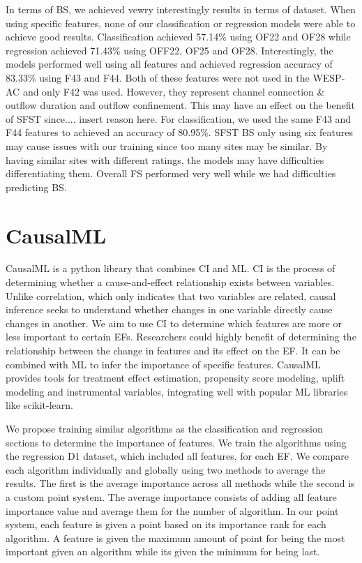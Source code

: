 \documentclass[12pt,letterpaper]{article}
\begin{document}
In terms of \ac{BS}, we achieved vewry interestingly results in terms of dataset.
When using specific features, none of our classification or regression models were able to achieve good results.
Classification achieved 57.14\% using OF22 and OF28 while regression achieved 71.43\% using OFF22, OF25 and OF28.
Interestingly, the models performed well using all features and achieved regression accuracy of 83.33\% using F43 and F44.
Both of these features were not used in the WESP-AC and only F42 was used.
However, they represent channel connection \& outflow duration and outflow confinement.
This may have an effect on the benefit of \ac{SFST} since.... insert reason here.
For classification, we used the same F43 and F44 features to achieved an accuracy of 80.95\%.
\ac{SFST} \ac{BS} only using six features may cause issues with our training since too many sites may be similar.
By having similar sites with different ratings, the models may have difficulties differentiating them.
Overall \ac{FS} performed very well while we had difficulties predicting \ac{BS}.




\section{CausalML}
CausalML is a python library that combines \ac{CI} and \ac{ML}.
\ac{CI} is the process of determining whether a cause-and-effect relationship exists between variables.
Unlike correlation, which only indicates that two variables are related, causal inference seeks to understand whether changes in one variable directly cause changes in another. 
We aim to use \ac{CI} to determine which features are more or less important to certain \ac{EF}s.
Researchers could highly benefit of determining the relationship between the change in features and its effect on the \ac{EF}.
It can be combined with \ac{ML} to infer the importance of specific features.
CausalML provides tools for treatment effect estimation, propensity score modeling, uplift modeling and instrumental variables, integrating well with popular \ac{ML} libraries like scikit-learn.

We propose training similar algorithms as the classification and regression sections to determine the importance of features.
We train the algorithms using the regression D1 dataset, which included all features, for each \ac{EF}.
We compare each algorithm individually and globally using two methods to average the results.
The first is the average importance across all methods while the second is a custom point system.
The average importance consists of adding all feature importance value and average them for the number of algorithm.
In our point system, each feature is given a point based on its importance rank for each algorithm.
A feature is given the maximum amount of point for being the most important given an algorithm while its given the minimum for being last.
\end{document}
